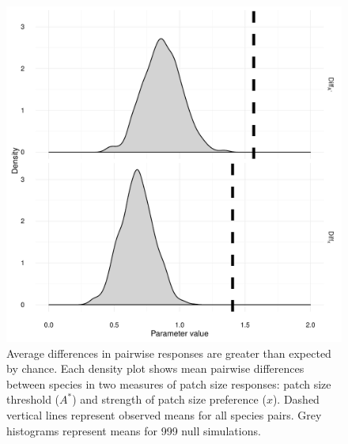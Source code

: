\begin{figure}[htbp]
\centering
\includegraphics[width=5.5in]{figures/overall_null.pdf}
\caption[Average differences in pairwise responses are greater than expected by chance]{Average differences in pairwise responses are greater than expected by chance. Each density plot shows mean pairwise differences between species in two measures of patch size responses: patch size threshold (\(A^{*}\)) and strength of patch size preference
(\(x\)). Dashed vertical lines represent observed means for all species
pairs. Grey histograms represent means for 999 null simulations.}
\label{fig:meanpairwise}
\end{figure}


